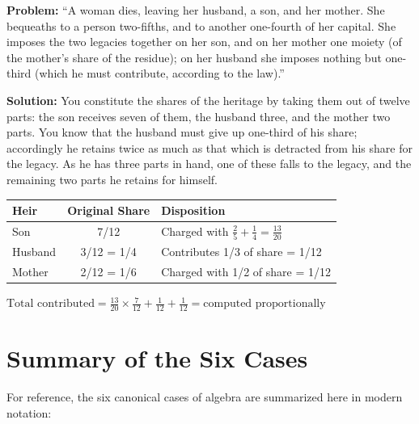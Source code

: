 \documentclass[11pt,a4paper]{book}
\begin{document}
\textbf{Problem:} ``A woman dies, leaving her husband, a son, and her
mother. She bequeaths to a person two-fifths, and to another one-fourth of
her capital. She imposes the two legacies together on her son, and on her
mother one moiety (of the mother's share of the residue); on her husband she
imposes nothing but one-third (which he must contribute, according to the
law).''

\textbf{Solution:} You constitute the shares of the heritage by taking them
out of twelve parts: the son receives seven of them, the husband three, and
the mother two parts. You know that the husband must give up one-third of
his share; accordingly he retains twice as much as that which is detracted
from his share for the legacy. As he has three parts in hand, one of these
falls to the legacy, and the remaining two parts he retains for himself.

\begin{mathbox}
\begin{center}
\begin{tabular}{l|c|l}
\textbf{Heir} & \textbf{Original Share} & \textbf{Disposition} \\
\hline
Son & 7/12 & Charged with $\frac{2}{5} + \frac{1}{4} = \frac{13}{20}$ \\
Husband & 3/12 = 1/4 & Contributes 1/3 of share = 1/12 \\
Mother & 2/12 = 1/6 & Charged with 1/2 of share = 1/12 \\
\end{tabular}
\end{center}

$\text{Total contributed} = \frac{13}{20} \times \frac{7}{12} + \frac{1}{12} + \frac{1}{12} = \text{computed proportionally}$
\end{mathbox}

\newpage

\appendix

\chapter{Summary of the Six Cases}
\label{app:six-cases}

For reference, the six canonical cases of algebra are summarized here in
modern notation:
\end{document}
